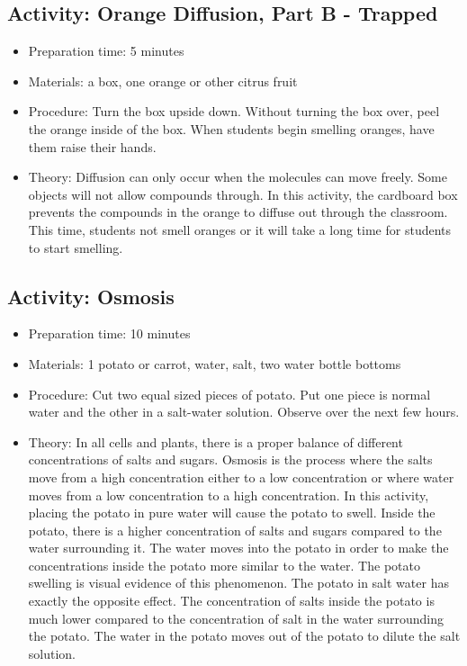 \subsection{Activity: Orange Diffusion, Part B - Trapped}
\begin{itemize}
\item{Preparation time: 5 minutes}
\item{Materials: a box, one orange or other citrus fruit}
\item{Procedure: Turn the box upside down. Without turning the box over, peel the orange inside of the box. When students begin smelling oranges, have them raise their hands.}
\item{Theory: Diffusion can only occur when the molecules can move freely. Some objects will not allow compounds through. In this activity, the cardboard box prevents the compounds in the orange to diffuse out through the classroom. This time, students not smell oranges or it will take a long time for students to start smelling.}
\end{itemize}

\subsection{Activity: Osmosis}
\begin{itemize}
\item{Preparation time: 10 minutes}
\item{Materials: 1 potato or carrot, water, salt, two water bottle bottoms}
\item{Procedure: Cut two equal sized pieces of potato. Put one piece is normal water and the other in a salt-water solution. Observe over the next few hours.}
\item{Theory: In all cells and plants, there is a proper balance of different concentrations of salts and sugars. Osmosis is the process where the salts move from a high concentration either to a low concentration or where water moves from a low concentration to a high concentration. In this activity, placing the potato in pure water will cause the potato to swell. Inside the potato, there is a higher concentration of salts and sugars compared to the water surrounding it. The water moves into the potato in order to make the concentrations inside the potato more similar to the water. The potato swelling is visual evidence of this phenomenon. The potato in salt water has exactly the opposite effect. The concentration of salts inside the potato is much lower compared to the concentration of salt in the water surrounding the potato. The water in the potato moves out of the potato to dilute the salt solution. }
\end{itemize}

